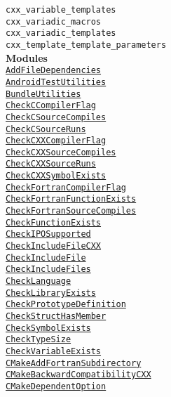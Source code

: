 \documentclass{article}
\newcommand{\cmakemodule}[1]{{\href{https://cmake.org/cmake/help/v3.13/module/#1.html}{{\lstinline{#1}}}}}
\newcommand{\cmakecxxfeature}[1]{\lstinline{#1}}
\begin{document}
\begin{minipage}[t]{0.18\linewidth}
\cmakecxxfeature{cxx_variable_templates}\\
\cmakecxxfeature{cxx_variadic_macros}\\
\cmakecxxfeature{cxx_variadic_templates}\\
\cmakecxxfeature{cxx_template_template_parameters}\\

\textbf{Modules}\\
\cmakemodule{AddFileDependencies}\\
\cmakemodule{AndroidTestUtilities}\\
\cmakemodule{BundleUtilities}\\
\cmakemodule{CheckCCompilerFlag}\\
\cmakemodule{CheckCSourceCompiles}\\
\cmakemodule{CheckCSourceRuns}\\
\cmakemodule{CheckCXXCompilerFlag}\\
\cmakemodule{CheckCXXSourceCompiles}\\
\cmakemodule{CheckCXXSourceRuns}\\
\cmakemodule{CheckCXXSymbolExists}\\
\cmakemodule{CheckFortranCompilerFlag}\\
\cmakemodule{CheckFortranFunctionExists}\\
\cmakemodule{CheckFortranSourceCompiles}\\
\cmakemodule{CheckFunctionExists}\\
\cmakemodule{CheckIPOSupported}\\
\cmakemodule{CheckIncludeFileCXX}\\
\cmakemodule{CheckIncludeFile}\\
\cmakemodule{CheckIncludeFiles}\\
\cmakemodule{CheckLanguage}\\
\cmakemodule{CheckLibraryExists}\\
\cmakemodule{CheckPrototypeDefinition}\\
\cmakemodule{CheckStructHasMember}\\
\cmakemodule{CheckSymbolExists}\\
\cmakemodule{CheckTypeSize}\\
\cmakemodule{CheckVariableExists}\\
\cmakemodule{CMakeAddFortranSubdirectory}\\
\cmakemodule{CMakeBackwardCompatibilityCXX}\\
\cmakemodule{CMakeDependentOption}\\

\end{minipage}
\end{document}
